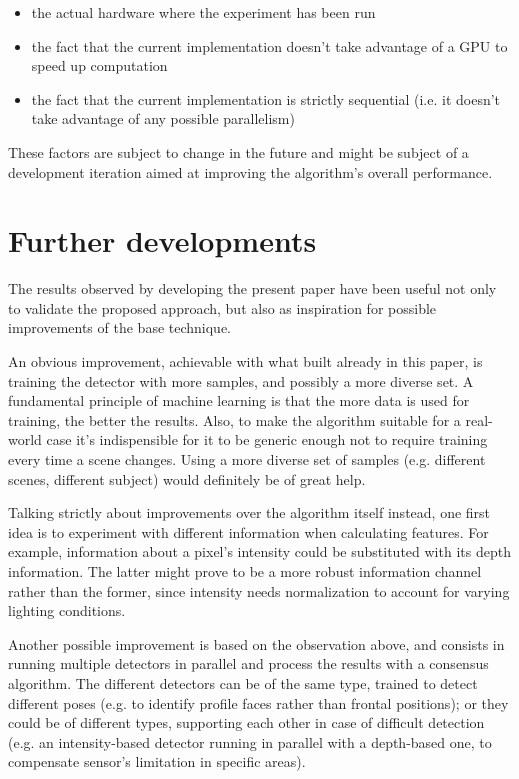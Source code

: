 \documentclass[a4paper,11pt,titlepage]{article}
\begin{document}
\begin{itemize}
  \item the actual hardware where the experiment has been run
  \item the fact that the current implementation doesn't take advantage of a
    GPU to speed up computation
  \item the fact that the current implementation is strictly sequential (i.e. it
    doesn't take advantage of any possible parallelism)
\end{itemize}

These factors are subject to change in the future and might be subject of a
development iteration aimed at improving the algorithm's overall performance.

\section{Further developments}
The results observed by developing the present paper have been useful not only to
validate the proposed approach, but also as inspiration for possible
improvements of the base technique.

An obvious improvement, achievable with what built already in this paper, is
training the detector with more samples, and possibly a more diverse set. A
fundamental principle of machine learning is that the more data is used for
training, the better the results. Also, to make the algorithm suitable for a
real-world case it's indispensible for it to be generic enough not to require
training every time a scene changes. Using a more diverse set of samples (e.g.
different scenes, different subject) would definitely be of great help.

Talking strictly about improvements over the algorithm itself instead, one first
idea is to experiment with different information when calculating features. For
example, information about a pixel's intensity could be substituted with its
depth information. The latter might prove to be a more robust information
channel rather than the former, since intensity needs normalization to account
for varying lighting conditions.

Another possible improvement is based on the observation above, and consists in
running multiple detectors in parallel and process the results with a consensus
algorithm. The different detectors can be of the same type, trained to detect
different poses (e.g. to identify profile faces rather than frontal positions);
or they could be of different types, supporting each other in case of difficult
detection (e.g. an intensity-based detector running in parallel with a
depth-based one, to compensate sensor's limitation in specific areas).
\end{document}
